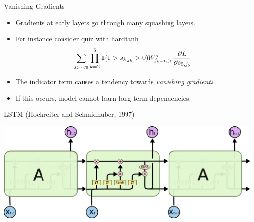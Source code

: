 \documentclass{beamer}
\begin{document}
\begin{frame}{Vanishing Gradients}
  \begin{itemize}
  \item Gradients at early layers go through many squashing layers.
    \air

  \item For instance consider quiz with  hardtanh
    \[      \sum_{j_2 \ldots j_5} \prod_{k=2}^5 \mathbf{1}(1 > s_{k, j_k} > 0)  W^s_{j_{k-1},j_k}  \frac{\partial L}{\partial s_{5, j_5}}    \]

    \air
  \item The indicator term causes a tendency towards \textit{vanishing gradients}.
   \air

  \item If this occurs, model cannot learn long-term dependencies.
 
  \end{itemize}
  
\end{frame}

\begin{frame}{LSTM (Hochreiter and Schmidhuber, 1997)}
  \begin{center}
    \includegraphics[width=\textwidth]{LSTM3-chain}
  \end{center}
\end{frame}
\end{document}
